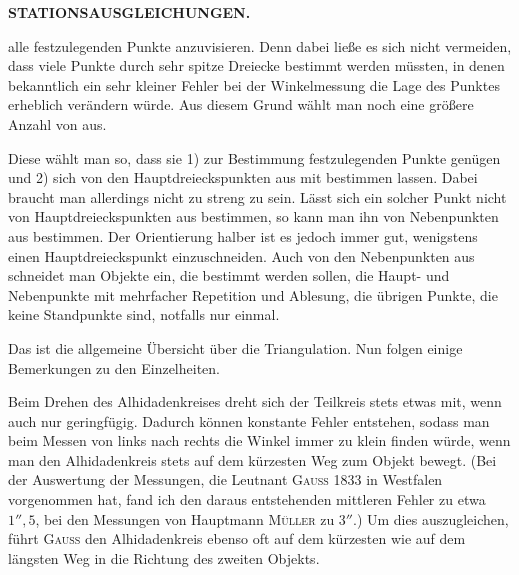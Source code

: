 \par\clearpage
\noindent\null\hfill{\small\textbf{STATIONSAUSGLEICHUNGEN.}}\hfill{}\par\medskip

\noindent alle festzulegenden Punkte anzuvisieren. Denn dabei ließe es sich nicht vermeiden, dass viele Punkte durch sehr spitze Dreiecke bestimmt werden müssten, in denen bekanntlich ein sehr kleiner Fehler bei der Winkelmessung die Lage des Punktes erheblich verändern würde. Aus diesem Grund wählt man noch eine größere Anzahl von  aus.

Diese wählt man so, dass sie 1) zur Bestimmung  festzulegenden Punkte genügen und 2) sich  von den Hauptdreieckspunkten aus mit  bestimmen lassen. Dabei braucht man allerdings nicht zu streng zu sein. Lässt sich ein solcher Punkt nicht von Hauptdreieckspunkten aus bestimmen, so kann man ihn von Nebenpunkten aus bestimmen. Der Orientierung halber ist es jedoch immer gut, wenigstens einen Hauptdreieckspunkt einzuschneiden. Auch von den Nebenpunkten aus schneidet man  Objekte ein, die bestimmt werden sollen, die Haupt- und Nebenpunkte mit mehrfacher Repetition und Ablesung, die übrigen Punkte, die keine Standpunkte sind, notfalls nur einmal.

Das ist die allgemeine Übersicht über die Triangulation. Nun folgen einige Bemerkungen zu den Einzelheiten.\par
\noindent Beim Drehen des Alhidadenkreises dreht sich der Teilkreis stets etwas mit, wenn auch nur geringfügig. Dadurch können konstante Fehler entstehen, sodass man beim Messen von links nach rechts die Winkel immer zu klein finden würde, wenn man den Alhidadenkreis stets auf dem kürzesten Weg zum Objekt bewegt. (Bei der Auswertung der Messungen, die Leutnant \textsc{Gauss} 1833 in Westfalen vorgenommen hat, fand ich den daraus entstehenden mittleren Fehler zu etwa \(1''{,}5\), bei den Messungen von Hauptmann \textsc{Müller} zu \(3''\).) Um dies auszugleichen, führt \textsc{Gauss} den Alhidadenkreis ebenso oft auf dem kürzesten wie auf dem längsten Weg in die Richtung des zweiten Objekts.

\begin{center}
\end{center}

